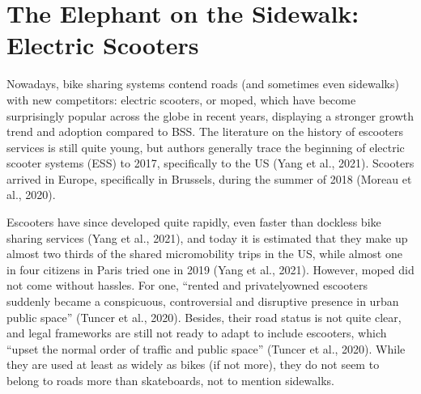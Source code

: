 \documentclass[letterpaper,10pt,english]{jupyterBook}
\begin{document}
\section{The Elephant on the Sidewalk: Electric Scooters}
\label{\detokenize{02-bikesharing_and_bikemi:the-elephant-on-the-sidewalk-electric-scooters}}
\sphinxAtStartPar
Nowadays, bike sharing systems contend roads (and sometimes even sidewalks) with new competitors: electric scooters, or moped, which have become surprisingly popular across the globe in recent years, displaying a stronger growth trend and adoption compared to BSS. The literature on the history of e\sphinxhyphen{}scooters services is still quite young, but authors generally trace the beginning of electric scooter systems (ESS) to 2017, specifically to the US (Yang et al., 2021). Scooters arrived in Europe, specifically in Brussels, during the summer of 2018 (Moreau et al., 2020).

\sphinxAtStartPar
E\sphinxhyphen{}scooters have since developed quite rapidly, even faster than dockless bike sharing services (Yang et al., 2021), and today it is estimated that they make up almost two thirds of the shared micromobility trips in the US, while almost one in four citizens in Paris tried one in 2019 (Yang et al., 2021). However, moped did not come without hassles. For one, “rented and privately\sphinxhyphen{}owned e\sphinxhyphen{}scooters suddenly became a conspicuous, controversial and disruptive presence in urban public space” (Tuncer et al., 2020). Besides, their road status is not quite clear, and legal frameworks are still not ready to adapt to include e\sphinxhyphen{}scooters, which “upset the normal order of traffic and public space” (Tuncer et al., 2020). While they are used at least as widely as bikes (if not more), they do not seem to belong to roads more than skateboards, not to mention sidewalks.
\end{document}
